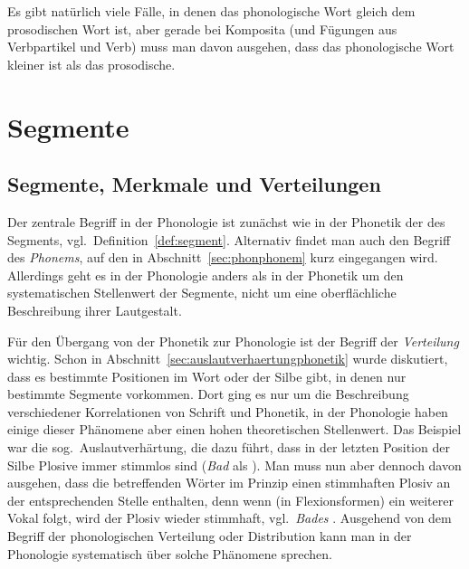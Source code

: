 
Es gibt natürlich viele Fälle, in denen das phonologische Wort gleich dem prosodischen Wort ist, aber gerade bei Komposita (und \zB Fügungen aus Verbpartikel und Verb) muss man davon ausgehen, dass das phonologische Wort kleiner ist als das prosodische.








\section{Segmente}

\label{sec:segmentalephol}

\subsection{Segmente, Merkmale und Verteilungen}

\label{sec:segmenteverteilungen}
\label{sec:verteilungen}

Der zentrale Begriff in der Phonologie ist zunächst wie in der Phonetik der des Segments, vgl.\ Definition~\ref{def:segment}.
Alternativ findet man auch den Begriff des \textit{Phonems}, auf den in Abschnitt~\ref{sec:phonphonem} kurz eingegangen wird.
Allerdings geht es in der Phonologie anders als in der Phonetik um den systematischen Stellenwert der Segmente, nicht um eine oberflächliche Beschreibung ihrer Lautgestalt.

Für den Übergang von der Phonetik zur Phonologie ist der Begriff der \textit{Verteilung} wichtig.
Schon in Abschnitt~\ref{sec:auslautverhaertungphonetik} wurde diskutiert, dass es bestimmte Positionen im Wort oder der Silbe gibt, in denen nur bestimmte Segmente vorkommen.
Dort ging es nur um die Beschreibung verschiedener Korrelationen von Schrift und Phonetik, in der Phonologie haben einige dieser Phänomene aber einen hohen theoretischen Stellenwert.
Das Beispiel war die sog.\ Auslautverhärtung, die dazu führt, dass in der letzten Position der Silbe Plosive immer stimmlos sind (\textit{Bad} als \textipa{[ba:t]}).
Man muss nun aber dennoch davon ausgehen, dass die betreffenden Wörter im Prinzip einen stimmhaften Plosiv an der entsprechenden Stelle enthalten, denn wenn (\zB in Flexionsformen) ein weiterer Vokal folgt, wird der Plosiv wieder stimmhaft, vgl.\ \textit{Bades} \textipa{[ba:d@s]}.
Ausgehend von dem Begriff der phonologischen Verteilung oder Distribution kann man in der Phonologie systematisch über solche Phänomene sprechen.


